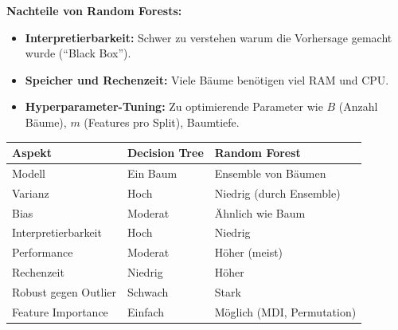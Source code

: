 \textbf{Nachteile von Random Forests:}
\begin{itemize}[leftmargin=1.5em]
    \item \textbf{Interpretierbarkeit:} Schwer zu verstehen warum die Vorhersage gemacht wurde (``Black Box'').
    \item \textbf{Speicher und Rechenzeit:} Viele Bäume benötigen viel RAM und CPU.
    \item \textbf{Hyperparameter-Tuning:} Zu optimierende Parameter wie $B$ (Anzahl Bäume), $m$ (Features pro Split), Baumtiefe.
\end{itemize}

\begin{table}[h]
    \centering
    \small
    \begin{tabular}{|l|l|l|}
        \hline
        \textbf{Aspekt} & \textbf{Decision Tree} & \textbf{Random Forest} \\
        \hline
        Modell & Ein Baum & Ensemble von Bäumen \\
        \hline
        Varianz & Hoch & Niedrig (durch Ensemble) \\
        \hline
        Bias & Moderat & Ähnlich wie Baum \\
        \hline
        Interpretierbarkeit & Hoch & Niedrig \\
        \hline
        Performance & Moderat & Höher (meist) \\
        \hline
        Rechenzeit & Niedrig & Höher \\
        \hline
        Robust gegen Outlier & Schwach & Stark \\
        \hline
        Feature Importance & Einfach & Möglich (MDI, Permutation) \\
        \hline
    \end{tabular}
\end{table}


